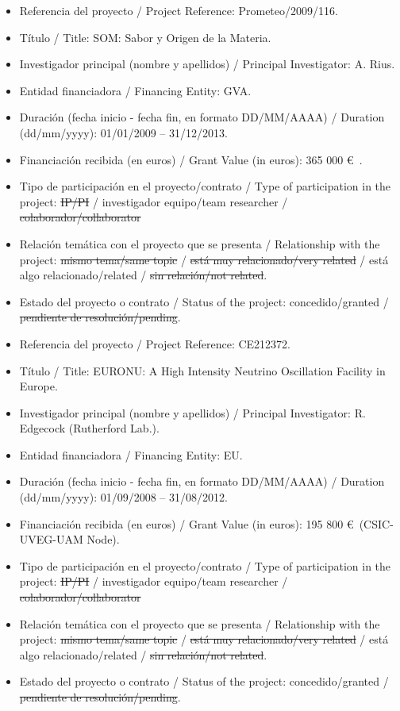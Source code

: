 \vspace{24pt}

\begin{itemize}
\item Referencia del proyecto / Project Reference: Prometeo/2009/116.
\item T\'itulo / Title: SOM: Sabor y Origen de la Materia.
\item Investigador principal (nombre y apellidos) / Principal Investigator: A. Rius.
\item Entidad financiadora / Financing Entity: GVA.
\item Duraci\'on (fecha inicio - fecha fin, en formato DD/MM/AAAA) / Duration (dd/mm/yyyy): 01/01/2009 -- 31/12/2013.
\item Financiaci\'on recibida (en euros) / Grant Value (in euros): 365 000 \euro\ .
\item Tipo de participaci\'on en el proyecto/contrato / Type of participation in the project: \st{IP/PI} / investigador equipo/team researcher / \st{colaborador/collaborator}
\item Relaci\'on tem\'atica con el proyecto que se presenta  /  Relationship with the project: \st{mismo tema/same topic} / \st{est\'a muy relacionado/very related} / est\'a algo relacionado/related / \st{sin relaci\'on/not related}.
\item Estado del proyecto o contrato / Status of the project: concedido/granted   /  \st{pendiente de resoluci\'on/pending}.
\end{itemize}

\vspace{24pt}

\begin{itemize}
\item Referencia del proyecto / Project Reference: CE212372.
\item T\'itulo / Title: EURONU: A High Intensity Neutrino Oscillation Facility in Europe.
\item Investigador principal (nombre y apellidos) / Principal Investigator: R. Edgecock (Rutherford Lab.).
\item Entidad financiadora / Financing Entity: EU.
\item Duraci\'on (fecha inicio - fecha fin, en formato DD/MM/AAAA) / Duration (dd/mm/yyyy): 01/09/2008 -- 31/08/2012.
\item Financiaci\'on recibida (en euros) / Grant Value (in euros): 195 800 \euro\  (CSIC-UVEG-UAM Node).
\item Tipo de participaci\'on en el proyecto/contrato / Type of participation in the project: \st{IP/PI} / investigador equipo/team researcher / \st{colaborador/collaborator}
\item Relaci\'on tem\'atica con el proyecto que se presenta  /  Relationship with the project: \st{mismo tema/same topic} / \st{est\'a muy relacionado/very related} / est\'a algo relacionado/related / \st{sin relaci\'on/not related}.
\item Estado del proyecto o contrato / Status of the project: concedido/granted   /  \st{pendiente de resoluci\'on/pending}.
\end{itemize}

